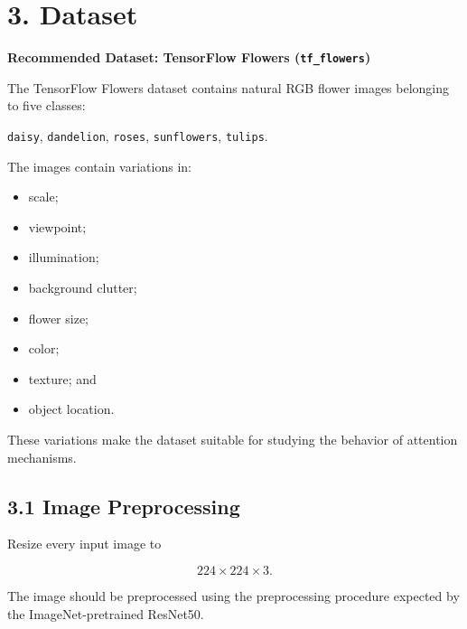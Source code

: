 \documentclass[10pt]{article}
\begin{document}
\section*{3. Dataset}

\textbf{Recommended Dataset: TensorFlow Flowers (\texttt{tf\_flowers})}

The TensorFlow Flowers dataset contains natural RGB flower images belonging
to five classes:

\begin{center}
\texttt{daisy},
\quad
\texttt{dandelion},
\quad
\texttt{roses},
\quad
\texttt{sunflowers},
\quad
\texttt{tulips}.
\end{center}

The images contain variations in:

\begin{itemize}

\item scale;

\item viewpoint;

\item illumination;

\item background clutter;

\item flower size;

\item color;

\item texture; and

\item object location.

\end{itemize}

These variations make the dataset suitable for studying the behavior of
attention mechanisms.

\subsection*{3.1 Image Preprocessing}

Resize every input image to

\[
224\times224\times3.
\]

The image should be preprocessed using the preprocessing procedure expected
by the ImageNet-pretrained ResNet50.
\end{document}

